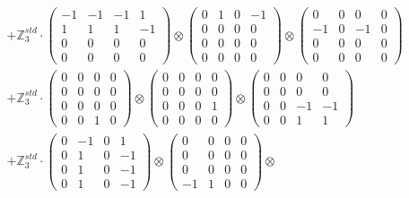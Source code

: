 \documentclass{article}
\begin{document}
{\begin{align}
        &+ \label{Rs16-Rc11-Solution-32-c22} \mathbb{Z}_3^{std} \cdot 
            \begin{pmatrix} -1 & -1 & -1 & 1 \\ 1 & 1 & 1 & -1 \\ 0 & 0 & 0 & 0 \\ 0 & 0 & 0 & 0 \end{pmatrix} \otimes 
            \begin{pmatrix} 0 & 1 & 0 & -1 \\ 0 & 0 & 0 & 0 \\ 0 & 0 & 0 & 0 \\ 0 & 0 & 0 & 0 \end{pmatrix} \otimes 
            \begin{pmatrix} 0 & 0 & 0 & 0 \\ -1 & 0 & -1 & 0 \\ 0 & 0 & 0 & 0 \\ 0 & 0 & 0 & 0 \end{pmatrix} \\ 
        &+ \label{Rs16-Rc11-Solution-32-c23} \mathbb{Z}_3^{std} \cdot 
            \begin{pmatrix} 0 & 0 & 0 & 0 \\ 0 & 0 & 0 & 0 \\ 0 & 0 & 0 & 0 \\ 0 & 0 & 1 & 0 \end{pmatrix} \otimes 
            \begin{pmatrix} 0 & 0 & 0 & 0 \\ 0 & 0 & 0 & 0 \\ 0 & 0 & 0 & 1 \\ 0 & 0 & 0 & 0 \end{pmatrix} \otimes 
            \begin{pmatrix} 0 & 0 & 0 & 0 \\ 0 & 0 & 0 & 0 \\ 0 & 0 & -1 & -1 \\ 0 & 0 & 1 & 1 \end{pmatrix} \\ 
        &+ \label{Rs16-Rc11-Solution-32-c24} \mathbb{Z}_3^{std} \cdot 
            \begin{pmatrix} 0 & -1 & 0 & 1 \\ 0 & 1 & 0 & -1 \\ 0 & 1 & 0 & -1 \\ 0 & 1 & 0 & -1 \end{pmatrix} \otimes 
            \begin{pmatrix} 0 & 0 & 0 & 0 \\ 0 & 0 & 0 & 0 \\ 0 & 0 & 0 & 0 \\ -1 & 1 & 0 & 0 \end{pmatrix} \otimes 

\end{align}}
\end{document}
